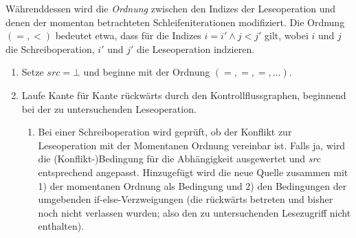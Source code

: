 Währenddessen wird die \textit{Ordnung} zwischen den Indizes der Leseoperation und denen der momentan betrachteten Schleifeniterationen modifiziert. Die Ordnung $(=,<)$ bedeutet etwa, dass für die Indizes $i=i'\wedge j<j'$ gilt, wobei $i$ und $j$ die Schreiboperation, $i'$ und $j'$ die Leseoperation indzieren.
\begin{enumerate}
    \item Setze $\mathit{src}={\bot}$ und beginne mit der Ordnung $(=,=,=,\ldots)$.
    \item Laufe Kante für Kante rückwärts durch den Kontrollflussgraphen, beginnend bei der zu untersuchenden Leseoperation.
        \begin{enumerate}
            \item Bei einer Schreiboperation wird geprüft, ob der Konflikt zur Leseoperation mit der Momentanen Ordnung vereinbar ist. Falls ja, wird die (Konflikt-)Bedingung für die Abhängigkeit ausgewertet und \textit{src} entsprechend angepasst.
            Hinzugefügt wird die neue Quelle zusammen mit 1) der momentanen Ordnung als Bedingung und 2) den Bedingungen der umgebenden if-else-Verzweigungen (die rückwärts betreten und bisher noch nicht verlassen wurden; also den zu untersuchenden Lesezugriff nicht enthalten).


\end{enumerate}
\end{enumerate}
